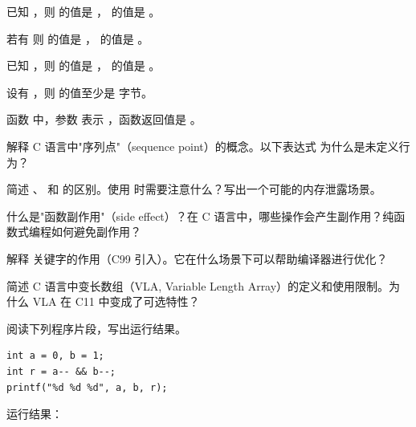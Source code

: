 \documentclass[a4paper,11pt]{article}
\begin{document}
\examtitle


\anslines{0.1cm}

\q 已知 ，则  的值是 \fillblank ， 的值是 \fillblank 。

\q 若有  则  的值是 \fillblank ， 的值是 \fillblank 。

\q 已知 ，则  的值是 \fillblank ， 的值是 \fillblank 。

\q 设有 ，则  的值至少是 \fillblank 字节。

\q 函数  中，参数  表示 \fillblank ，函数返回值是 \fillblank 。


\q 解释 C 语言中"序列点"（sequence point）的概念。以下表达式  为什么是未定义行为？
\anslines{1.5cm}

\q 简述 、 和  的区别。使用  时需要注意什么？写出一个可能的内存泄露场景。
\anslines{1.5cm}

\q 什么是"函数副作用"（side effect）？在 C 语言中，哪些操作会产生副作用？纯函数式编程如何避免副作用？
\anslines{1.5cm}

\q 解释  关键字的作用（C99 引入）。它在什么场景下可以帮助编译器进行优化？
\anslines{1.5cm}

\q 简述 C 语言中变长数组（VLA, Variable Length Array）的定义和使用限制。为什么 VLA 在 C11 中变成了可选特性？
\anslines{1.5cm}


阅读下列程序片段，写出运行结果。

\q
\begin{lstlisting}[language={[custom]C}]
int a = 0, b = 1;
int r = a-- && b--;
printf("%d %d %d", a, b, r);
\end{lstlisting}
运行结果：\underline{\hspace{3cm}}
\end{document}
